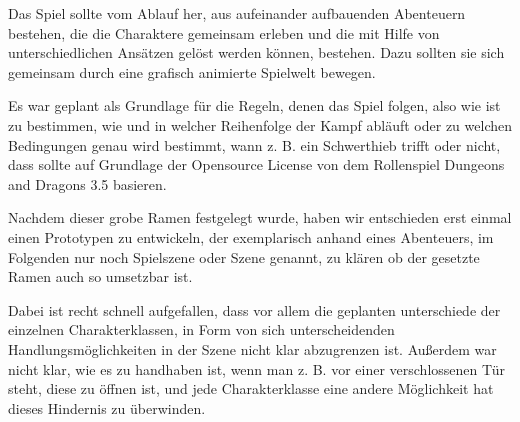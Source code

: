 Das Spiel sollte vom Ablauf her, aus aufeinander aufbauenden Abenteuern bestehen, die die Charaktere gemeinsam erleben und die mit Hilfe von unterschiedlichen Ansätzen gelöst werden können, bestehen. Dazu sollten sie sich gemeinsam durch eine grafisch animierte Spielwelt bewegen.

Es war geplant als Grundlage für die Regeln, denen das Spiel folgen, also wie ist zu bestimmen, wie und in welcher Reihenfolge der Kampf abläuft oder zu welchen Bedingungen genau wird bestimmt, wann z. B. ein Schwerthieb trifft oder nicht, dass sollte auf Grundlage der Opensource License von dem Rollenspiel Dungeons and Dragons 3.5 basieren.

Nachdem dieser grobe Ramen festgelegt wurde, haben wir entschieden erst einmal einen Prototypen zu entwickeln, der exemplarisch anhand eines Abenteuers, im Folgenden nur noch Spielszene oder Szene genannt, zu klären ob der gesetzte Ramen auch so umsetzbar ist. 

Dabei ist recht schnell aufgefallen, dass vor allem die geplanten unterschiede der einzelnen Charakterklassen, in Form von sich unterscheidenden Handlungsmöglichkeiten in der Szene nicht klar abzugrenzen ist. Außerdem war nicht klar, wie es zu handhaben ist, wenn man z. B. vor einer verschlossenen Tür steht, diese zu öffnen ist, und jede Charakterklasse eine andere Möglichkeit hat dieses Hindernis zu überwinden. 

